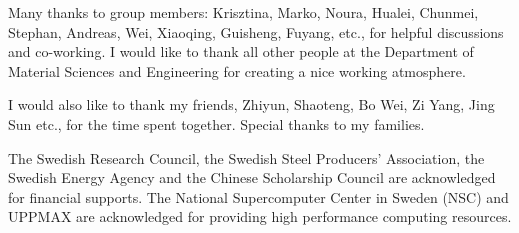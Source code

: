 \documentclass[a4paper, 12pt, titlepage,oneside,drop]{kthesis}
\begin{document}
Many thanks to group members: Krisztina, Marko, Noura, Hualei, Chunmei, Stephan, Andreas, Wei, Xiaoqing, Guisheng, Fuyang, etc., for
helpful discussions and co-working. I would like to thank all other people at the Department of Material Sciences and Engineering for creating a nice working atmosphere.

I would also like to thank my friends, Zhiyun, Shaoteng, Bo Wei, Zi Yang, Jing Sun etc., for the time spent together.
Special thanks to my families.

The Swedish Research Council, the Swedish Steel Producers' Association, the Swedish Energy Agency and the Chinese Scholarship Council are acknowledged
for financial supports. The National Supercomputer Center in Sweden (NSC) and UPPMAX are acknowledged for providing high performance computing resources.


%

%


\newpage
\end{document}
